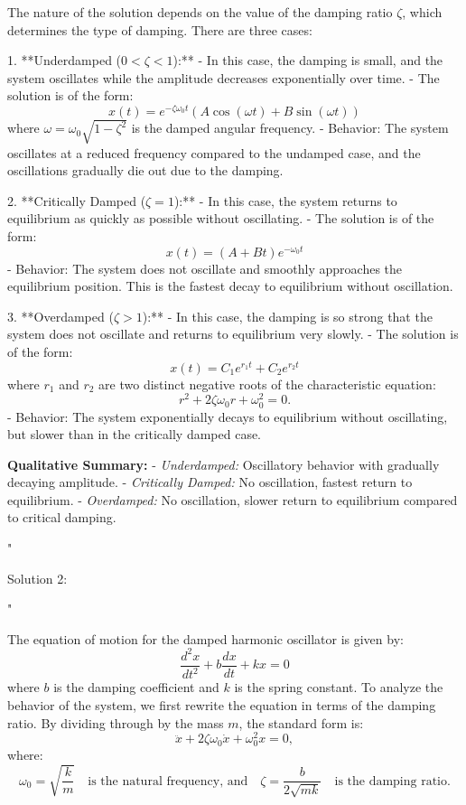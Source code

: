The nature of the solution depends on the value of the damping ratio \( \zeta \), which determines the type of damping. There are three cases:

1. **Underdamped (\( 0 < \zeta < 1 \)):**
   - In this case, the damping is small, and the system oscillates while the amplitude decreases exponentially over time.
   - The solution is of the form:
     \[
     x(t) = e^{-\zeta\omega_0 t} \left( A \cos(\omega t) + B \sin(\omega t) \right)
     \]
     where \( \omega = \omega_0 \sqrt{1 - \zeta^2} \) is the damped angular frequency.
   - Behavior: The system oscillates at a reduced frequency compared to the undamped case, and the oscillations gradually die out due to the damping.

2. **Critically Damped (\( \zeta = 1 \)):**
   - In this case, the system returns to equilibrium as quickly as possible without oscillating.
   - The solution is of the form:
     \[
     x(t) = (A + Bt)e^{-\omega_0 t}
     \]
   - Behavior: The system does not oscillate and smoothly approaches the equilibrium position. This is the fastest decay to equilibrium without oscillation.

3. **Overdamped (\( \zeta > 1 \)):**
   - In this case, the damping is so strong that the system does not oscillate and returns to equilibrium very slowly.
   - The solution is of the form:
     \[
     x(t) = C_1 e^{r_1 t} + C_2 e^{r_2 t}
     \]
     where \( r_1 \) and \( r_2 \) are two distinct negative roots of the characteristic equation:
     \[
     r^2 + 2\zeta\omega_0 r + \omega_0^2 = 0.
     \]
   - Behavior: The system exponentially decays to equilibrium without oscillating, but slower than in the critically damped case.

\textbf{Qualitative Summary:}
- \textit{Underdamped:} Oscillatory behavior with gradually decaying amplitude.
- \textit{Critically Damped:} No oscillation, fastest return to equilibrium.
- \textit{Overdamped:} No oscillation, slower return to equilibrium compared to critical damping.

"

Solution 2: 

"

The equation of motion for the damped harmonic oscillator is given by:
\[
\frac{d^2x}{dt^2} + b\frac{dx}{dt} + kx = 0
\]
where \( b \) is the damping coefficient and \( k \) is the spring constant. To analyze the behavior of the system, we first rewrite the equation in terms of the damping ratio. By dividing through by the mass \( m \), the standard form is:
\[
\ddot{x} + 2\zeta \omega_0 \dot{x} + \omega_0^2 x = 0,
\]
where:
\[
\omega_0 = \sqrt{\frac{k}{m}} \quad \text{is the natural frequency, and} \quad \zeta = \frac{b}{2\sqrt{mk}} \quad \text{is the damping ratio.}
\]

